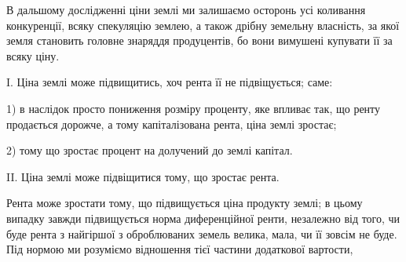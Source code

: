 В дальшому дослідженні ціни землі ми залишаємо осторонь усі коливання
конкуренції, всяку спекуляцію землею, а також дрібну земельну власність, за
якої земля становить головне знаряддя продуцентів, бо вони вимушені купувати її
за всяку ціну.

I. Ціна землі може підвищитись, хоч рента її не підвіщується; саме:

1) в наслідок просто пониження розміру проценту, яке впливає так, що
ренту продається дорожче, а тому капіталізована рента, ціна землі зростає;

2) тому що зростає процент на долучений до землі капітал.

II. Ціна землі може підвіщитися тому, що зростає рента.

Рента може зростати тому, що підвищується ціна продукту землі; в цьому
випадку завжди підвищується норма диференційної ренти, незалежно від того,
чи буде рента з найгіршої з оброблюваних земель велика, мала, чи її зовсім
не буде. Під нормою ми розуміємо відношення тієї частини додаткової вартости,